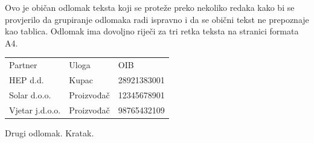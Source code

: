 \documentclass[a4paper]{article}
\begin{document}
Ovo je običan odlomak teksta koji se proteže preko nekoliko redaka kako bi se
provjerilo da grupiranje odlomaka radi ispravno i da se obični tekst ne
prepoznaje kao tablica. Odlomak ima dovoljno riječi za tri retka teksta na
stranici formata A4.

\vspace{2em}
\begin{tabular}{lll}
Partner & Uloga & OIB \\
HEP d.d. & Kupac & 28921383001 \\
Solar d.o.o. & Proizvođač & 12345678901 \\
Vjetar j.d.o.o. & Proizvođač & 98765432109 \\
\end{tabular}

\vspace{2em}
Drugi odlomak. Kratak.
\end{document}
